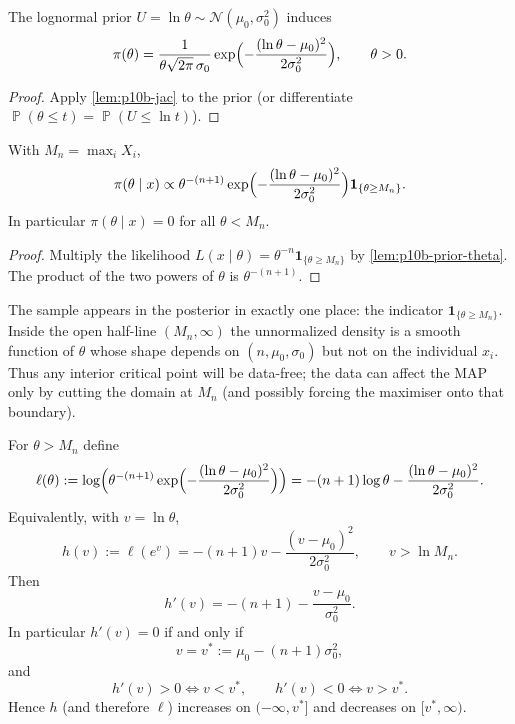 \documentclass[11pt,a4paper]{article}
\DeclareMathOperator{\Pbb}{\mathbb{P}}
\begin{document}
\begin{lemma}
\label{lem:p10b-prior-theta}
The lognormal prior \(U=\ln\theta\sim\mathcal{N}(\mu_0,\sigma_0^2)\) induces
\[
\pi(\theta)
=
\frac{1}{\theta\sqrt{2\pi}\,\sigma_0}
\exp\Bigl(-\frac{(\ln\theta-\mu_0)^2}{2\sigma_0^2}\Bigr),
\qquad
\theta>0.
\]
\end{lemma}

\begin{proof}
Apply \cref{lem:p10b-jac} to the prior (or differentiate \(\Pbb(\theta\le t)=\Pbb(U\le\ln t)\)).
\end{proof}

\begin{lemma}
\label{lem:p10b-post-theta}
With \(M_n=\max_i X_i\),
\begin{equation}
\label{eq:p10b-post}
\pi(\theta\mid x)
\propto
\theta^{-(n+1)}
\exp\Bigl(-\frac{(\ln\theta-\mu_0)^2}{2\sigma_0^2}\Bigr)
\mathbf{1}_{\{\theta\ge M_n\}}.
\end{equation}
In particular \(\pi(\theta\mid x)=0\) for all \(\theta<M_n\).
\end{lemma}

\begin{proof}
Multiply the likelihood \(L(x\mid\theta)=\theta^{-n}\mathbf{1}_{\{\theta\ge M_n\}}\) by \cref{lem:p10b-prior-theta}. The product of the two powers of \(\theta\) is \(\theta^{-(n+1)}\).
\end{proof}

\begin{remark*}
The sample appears in the posterior in exactly one place: the indicator \(\mathbf{1}_{\{\theta\ge M_n\}}\). Inside the open half-line \((M_n,\infty)\) the unnormalized density is a smooth function of \(\theta\) whose shape depends on \((n,\mu_0,\sigma_0)\) but not on the individual \(x_i\). Thus any interior critical point will be data-free; the data can affect the MAP only by cutting the domain at \(M_n\) (and possibly forcing the maximiser onto that boundary).
\end{remark*}

\begin{lemma}
\label{lem:p10b-logderiv}
For \(\theta>M_n\) define
\[
\ell(\theta)
:=
\log\Bigl(
\theta^{-(n+1)}
\exp\Bigl(-\frac{(\ln\theta-\mu_0)^2}{2\sigma_0^2}\Bigr)
\Bigr)
=
-(n+1)\log\theta
-
\frac{(\ln\theta-\mu_0)^2}{2\sigma_0^2}.
\]
Equivalently, with \(v=\ln\theta\),
\[
h(v)
:=
\ell(e^v)
=
-(n+1)v
-
\frac{(v-\mu_0)^2}{2\sigma_0^2},
\qquad
v>\ln M_n.
\]
Then
\begin{equation}
\label{eq:p10b-hprime}
h'(v)
=
-(n+1)-\frac{v-\mu_0}{\sigma_0^2}.
\end{equation}
In particular \(h'(v)=0\) if and only if
\[
v
=
v^*
:=
\mu_0-(n+1)\sigma_0^2,
\]
and
\[
h'(v)>0\iff v<v^*,
\qquad
h'(v)<0\iff v>v^*.
\]
Hence \(h\) (and therefore \(\ell\)) increases on \((-\infty,v^*]\) and decreases on \([v^*,\infty)\).
\end{lemma}
\end{document}

